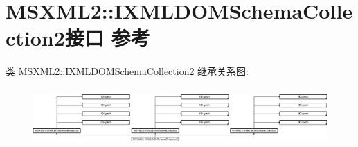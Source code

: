 \hypertarget{interface_m_s_x_m_l2_1_1_i_x_m_l_d_o_m_schema_collection2}{}\section{M\+S\+X\+M\+L2\+:\+:I\+X\+M\+L\+D\+O\+M\+Schema\+Collection2接口 参考}
\label{interface_m_s_x_m_l2_1_1_i_x_m_l_d_o_m_schema_collection2}
类 M\+S\+X\+M\+L2\+:\+:I\+X\+M\+L\+D\+O\+M\+Schema\+Collection2 继承关系图\+:\begin{figure}[H]
\begin{center}
\leavevmode
\includegraphics[height=2.267207cm]{interface_m_s_x_m_l2_1_1_i_x_m_l_d_o_m_schema_collection2}
\end{center}
\end{figure}
